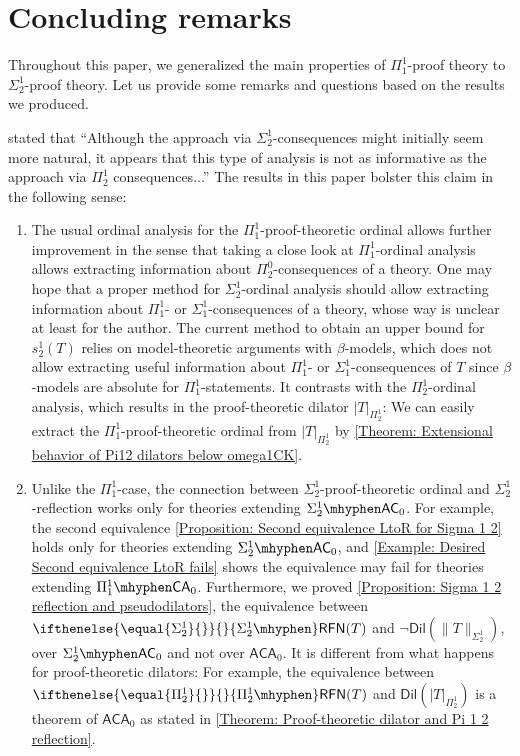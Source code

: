 \documentclass{mhkr}
\newcommand{\Dil}{\mathsf{Dil}}
\newcommand{\RFN}[1][]{\ifthenelse{\equal{#1}{}}{}{#1\mhyphen}\mathsf{RFN}}
\newcommand{\AC}{\mathsf{AC}}
\newcommand{\CA}{\mathsf{CA}}
\newcommand{\ACA}{\mathsf{ACA}}
\begin{document}
\section{Concluding remarks}
\label{Section: Finale}
Throughout this paper, we generalized the main properties of $\Pi^1_1$-proof theory to $\Sigma^1_2$-proof theory. Let us provide some remarks and questions based on the results we produced.

\cite{AguileraPakhomov2023Pi12} stated that ``Although the approach via $\Sigma^1_2$-consequences might initially seem more natural, it appears that this type of analysis is not as informative as the approach via $\Pi^1_2$ consequences...'' The results in this paper bolster this claim in the following sense:
\begin{enumerate}
    \item The usual ordinal analysis for the $\Pi^1_1$-proof-theoretic ordinal allows further improvement in the sense that taking a close look at $\Pi^1_1$-ordinal analysis allows extracting information about $\Pi^0_2$-consequences of a theory. One may hope that a proper method for $\Sigma^1_2$-ordinal analysis should allow extracting information about $\Pi^1_1$- or $\Sigma^1_1$-consequences of a theory, whose way is unclear at least for the author. The current method to obtain an upper bound for $s^1_2(T)$ relies on model-theoretic arguments with $\beta$-models, which does not allow extracting useful information about $\Pi^1_1$- or $\Sigma^1_1$-consequences of $T$ since $\beta$-models are absolute for $\Pi^1_1$-statements. It contrasts with the $\Pi^1_2$-ordinal analysis, which results in the proof-theoretic dilator $|T|_{\Pi^1_2}$: We can easily extract the $\Pi^1_1$-proof-theoretic ordinal from $|T|_{\Pi^1_2}$ by \autoref{Theorem: Extensional behavior of Pi12 dilators below omega1CK}.

    \item Unlike the $\Pi^1_1$-case, the connection between $\Sigma^1_2$-proof-theoretic ordinal and $\Sigma^1_2$-reflection works only for theories extending $\Sigma^1_2\mhyphen\AC_0$. For example, the second equivalence \autoref{Proposition: Second equivalence LtoR for Sigma 1 2} holds only for theories extending $\Sigma^1_2\mhyphen\AC_0$, and \autoref{Example: Desired Second equivalence LtoR fails} shows the equivalence may fail for theories extending $\Pi^1_1\mhyphen\CA_0$.
    Furthermore, we proved \autoref{Proposition: Sigma 1 2 reflection and pseudodilators}, the equivalence between $\RFN[\Sigma^1_2](T)$ and $\lnot\Dil(\|T\|_{\Sigma^1_2})$, over $\Sigma^1_2\mhyphen\AC_0$ and not over $\ACA_0$.
    It is different from what happens for proof-theoretic dilators: For example, the equivalence between $\RFN[\Pi^1_2](T)$ and $\Dil(|T|_{\Pi^1_2})$ is a theorem of $\ACA_0$ as stated in \autoref{Theorem: Proof-theoretic dilator and Pi 1 2 reflection}.


\end{enumerate}
\end{document}
